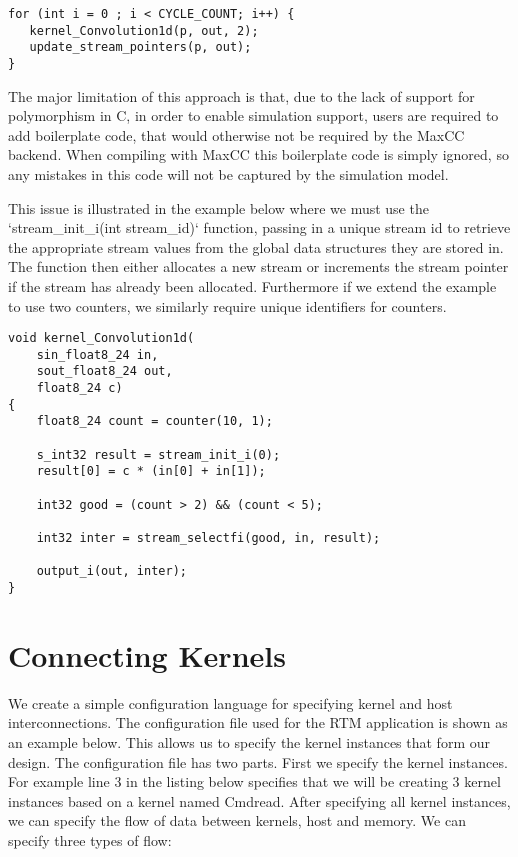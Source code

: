 \lstset{style=MaxC}

\begin{lstlisting}
for (int i = 0 ; i < CYCLE_COUNT; i++) {
   kernel_Convolution1d(p, out, 2);
   update_stream_pointers(p, out);
}
\end{lstlisting}

The major limitation of this approach is that, due to the lack of
support for polymorphism in C, in order to enable simulation support,
users are required to add boilerplate code, that would otherwise not
be required by the MaxCC backend. When compiling with MaxCC this
boilerplate code is simply ignored, so any mistakes in this code will
not be captured by the simulation model.

This issue is illustrated in the example below where we must use the
`stream\_init\_i(int stream\_id)` function, passing in a unique stream id
to retrieve the appropriate stream values from the global data
structures they are stored in. The function then either allocates a
new stream or increments the stream pointer if the stream has already
been allocated. Furthermore if we extend the example to use two
counters, we similarly require unique identifiers for counters.

\begin{lstlisting}
void kernel_Convolution1d(
    sin_float8_24 in,
    sout_float8_24 out,
    float8_24 c)
{
    float8_24 count = counter(10, 1);

    s_int32 result = stream_init_i(0);
	result[0] = c * (in[0] + in[1]);

    int32 good = (count > 2) && (count < 5);

    int32 inter = stream_selectfi(good, in, result);

    output_i(out, inter);
}

\end{lstlisting}

\section{Connecting Kernels}

We create a simple configuration language for specifying kernel and
host interconnections. The configuration file used for the RTM
application is shown as an example below. This allows us to specify
the kernel instances that form our design. The configuration file has
two parts. First we specify the kernel instances. For example line 3
in the listing below specifies that we will be creating 3 kernel
instances based on a kernel named Cmdread. After specifying all kernel
instances, we can specify the flow of data between kernels, host and
memory. We can specify three types of flow:

